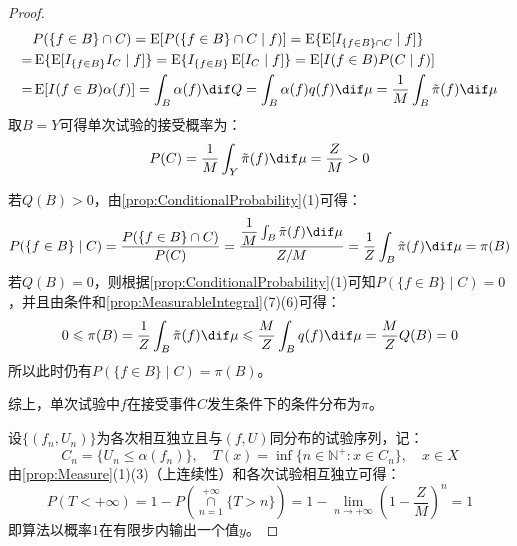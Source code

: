 \begin{proof}
	\begin{align*}
		&P(\{f\in B\}\cap C)=\operatorname{E}[P(\{f\in B\}\cap C\mid f)]=\operatorname{E}\{\operatorname{E}[I_{\{f\in B\}\cap C}\mid f]\} \\
		=&\operatorname{E}\{\operatorname{E}[I_{\{f\in B\}}I_C\mid f]\}=\operatorname{E}\{I_{\{f\in B\}}\operatorname{E}[I_C\mid f]\}=\operatorname{E}[I(f\in B)P(C\mid f)] \\
		=&\operatorname{E}[I(f\in B)\alpha(f)]=\int_{B}\alpha(f)\dif Q=\int_{B}\alpha(f)q(f)\dif\mu=\frac{1}{M}\int_{B}\tilde{\pi}(f)\dif\mu
	\end{align*}
	取$B=Y$可得单次试验的接受概率为：
	\begin{equation*}
		P(C)=\frac{1}{M}\int_{Y}\tilde{\pi}(f)\dif\mu=\frac{Z}{M}>0
	\end{equation*}\par
	若$Q(B)>0$，由\cref{prop:ConditionalProbability}(1)可得：
	\begin{equation*}
		P(\{f\in B\}\mid C)=\frac{P(\{f\in B\}\cap C)}{P(C)}=\frac{\dfrac{1}{M}\int_{B}\tilde{\pi}(f)\dif\mu}{Z/M}=\frac{1}{Z}\int_{B}\tilde{\pi}(f)\dif\mu=\pi(B)
	\end{equation*}
	若$Q(B)=0$，则根据\cref{prop:ConditionalProbability}(1)可知$P(\{f\in B\}\mid C)=0$，并且由条件和\cref{prop:MeasurableIntegral}(7)(6)可得：
	\begin{equation*}
		0\leqslant\pi(B)=\frac{1}{Z}\int_{B}\tilde{\pi}(f)\dif\mu\leqslant\frac{M}{Z}\int_{B}q(f)\dif\mu=\frac{M}{Z}Q(B)=0
	\end{equation*}
	所以此时仍有$P(\{f\in B\}\mid C)=\pi(B)$。\par
	综上，单次试验中$f$在接受事件$C$发生条件下的条件分布为$\pi$。\par
	设$\{(f_n,U_n)\}$为各次相互独立且与$(f,U)$同分布的试验序列，记：
	\begin{equation*}
		C_n=\{U_n\leqslant\alpha(f_n)\},\quad T(x)=\inf\{n\in\mathbb{N}^+:x\in C_n\},\quad x\in X
	\end{equation*}
	由\cref{prop:Measure}(1)(3)（上连续性）和各次试验相互独立可得：
	\begin{equation*}
		P(T<+\infty)=1-P\left(\underset{n=1}{\overset{+\infty}{\cap}}\{T>n\}\right)=1-\lim_{n\to+\infty}\left(1-\frac{Z}{M}\right)^n=1
	\end{equation*}
	即算法以概率$1$在有限步内输出一个值$y$。
\end{proof}
